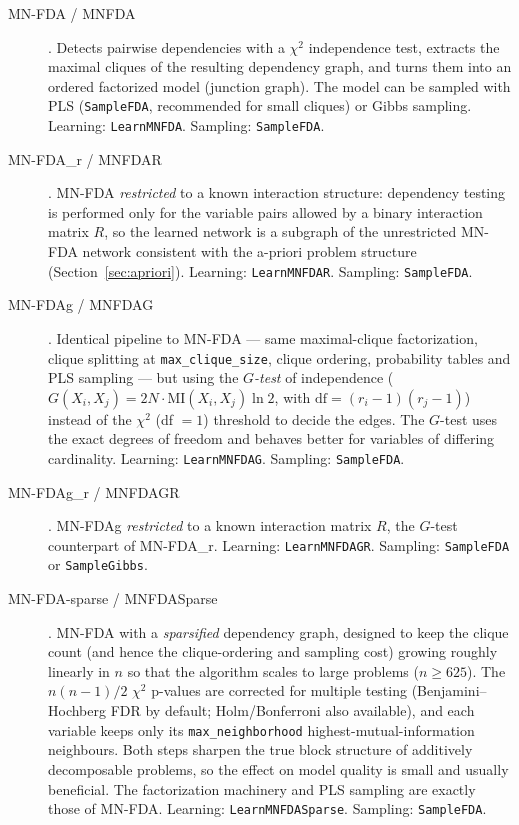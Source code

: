 \documentclass[a4paper,11pt]{article}
\begin{document}
\begin{description}
  \item[MN-FDA / MNFDA] \citep{Santana:2003c}.
    Detects pairwise dependencies with a $\chi^2$ independence test, extracts the
    maximal cliques of the resulting dependency graph, and turns them into an
    ordered factorized model (junction graph). The model can be sampled with PLS
    (\texttt{SampleFDA}, recommended for small cliques) or Gibbs sampling.
    Learning: \texttt{LearnMNFDA}. Sampling: \texttt{SampleFDA}.

  \item[MN-FDA\_r / MNFDAR] \citep{Santana:2005}.
    MN-FDA \emph{restricted} to a known interaction structure: dependency testing
    is performed only for the variable pairs allowed by a binary interaction
    matrix $R$, so the learned network is a subgraph of the unrestricted MN-FDA
    network consistent with the a-priori problem structure (Section~\ref{sec:apriori}).
    Learning: \texttt{LearnMNFDAR}. Sampling: \texttt{SampleFDA}.

  \item[MN-FDAg / MNFDAG] \citep{Santana:2005}.
    Identical pipeline to MN-FDA --- same maximal-clique factorization, clique
    splitting at \texttt{max\_clique\_size}, clique ordering, probability tables
    and PLS sampling --- but using the \emph{$G$-test} of independence
    ($G(X_i,X_j)=2N\cdot\mathrm{MI}(X_i,X_j)\ln 2$, with
    $\mathrm{df}=(r_i-1)(r_j-1)$) instead of the $\chi^2$ (df $=1$) threshold to
    decide the edges. The $G$-test uses the exact degrees of freedom and behaves
    better for variables of differing cardinality.
    Learning: \texttt{LearnMNFDAG}. Sampling: \texttt{SampleFDA}.

  \item[MN-FDAg\_r / MNFDAGR] \citep{Santana:2005}.
    MN-FDAg \emph{restricted} to a known interaction matrix $R$, the $G$-test
    counterpart of MN-FDA\_r.
    Learning: \texttt{LearnMNFDAGR}. Sampling: \texttt{SampleFDA} or \texttt{SampleGibbs}.

  \item[MN-FDA-sparse / MNFDASparse] \citep{Santana:2003c}.
    MN-FDA with a \emph{sparsified} dependency graph, designed to keep the
    clique count (and hence the clique-ordering and sampling cost) growing
    roughly linearly in $n$ so that the algorithm scales to large problems
    ($n\ge 625$). The $n(n-1)/2$ $\chi^2$ p-values are corrected for multiple
    testing (Benjamini--Hochberg FDR by default; Holm/Bonferroni also
    available), and each variable keeps only its \texttt{max\_neighborhood}
    highest-mutual-information neighbours. Both steps sharpen the true block
    structure of additively decomposable problems, so the effect on model
    quality is small and usually beneficial. The factorization machinery and PLS
    sampling are exactly those of MN-FDA.
    Learning: \texttt{LearnMNFDASparse}. Sampling: \texttt{SampleFDA}.


\end{description}
\end{document}
